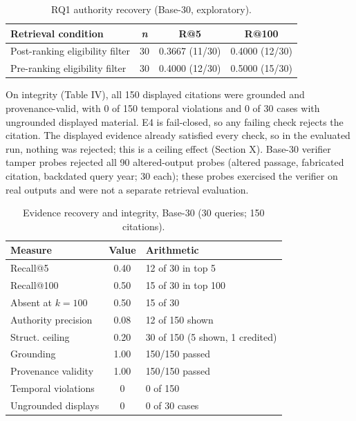 \documentclass[conference]{IEEEtran}
\begin{document}
\begin{table}[!t]
\caption{RQ1 authority recovery (Base-30, exploratory).}
\label{tab:3}
\centering\footnotesize

\setlength{\tabcolsep}{4pt}
\begin{tabular}{|>{\raggedright\arraybackslash}p{}|c|c|c|}
\hline
\textbf{Retrieval condition} & \textit{n} & \textbf{R@5} & \textbf{R@100} \\ \hline
Post-ranking eligibility filter & 30 & 0.3667 (11/30) & 0.4000 (12/30) \\
Pre-ranking eligibility filter & 30 & 0.4000 (12/30) & 0.5000 (15/30) \\ \hline
\end{tabular}
\end{table}

On integrity (Table IV), all 150 displayed citations were grounded and provenance-valid, with 0 of 150 temporal violations and 0 of 30 cases with ungrounded displayed material. E4 is fail-closed, so any failing check rejects the citation. The displayed evidence already satisfied every check, so in the evaluated run, nothing was rejected; this is a ceiling effect (Section X). Base-30 verifier tamper probes rejected all 90 altered-output probes (altered passage, fabricated citation, backdated query year; 30 each); these probes exercised the verifier on real outputs and were not a separate retrieval evaluation.

\begin{table}[!t]
\caption{Evidence recovery and integrity, Base-30 (30 queries; 150 citations).}
\label{tab:4}
\centering\footnotesize

\begin{tabular}{|l|c|l|}
\hline
\textbf{Measure} & \textbf{Value} & \textbf{Arithmetic} \\ \hline
Recall@5 & 0.40 & 12 of 30 in top 5 \\
Recall@100 & 0.50 & 15 of 30 in top 100 \\
Absent at $k=100$ & 0.50 & 15 of 30 \\
Authority precision & 0.08 & 12 of 150 shown \\
Struct. ceiling & 0.20 & 30 of 150 (5 shown, 1 credited) \\
Grounding & 1.00 & 150/150 passed \\
Provenance validity & 1.00 & 150/150 passed \\
Temporal violations & 0 & 0 of 150 \\
Ungrounded displays & 0 & 0 of 30 cases \\ \hline
\end{tabular}
\end{table}
\end{document}
